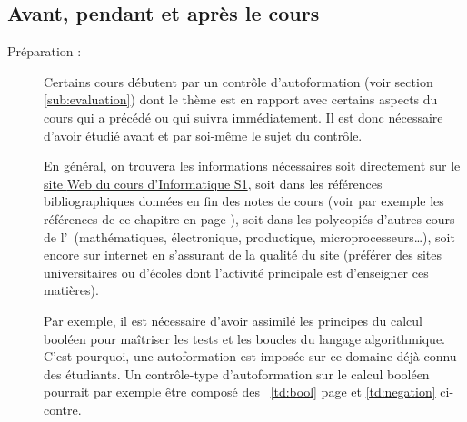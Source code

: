 \subsection{Avant, pendant et après le cours}\label{sub:cours}
\begin{description}
\item[Préparation :]  
	Certains cours débutent par un contrôle d'autoformation
	(voir section \ref{sub:evaluation}) dont le thème est en rapport avec certains
	aspects du cours qui a précédé ou qui suivra immédiatement.
	Il est donc nécessaire d'avoir étudié avant et par soi-même le
	sujet du contrôle.
	
	En général, on trouvera les informations nécessaires
	soit directement sur le 
	\href{https://moodle.enib.fr/course/view.php?id=24}{site {\sc Web} du cours d'Informatique S1}, 
	soit dans les références bibliographiques données en fin des notes de cours
	(voir par exemple les références de ce chapitre en page \pageref{ch:biblio}),
	soit dans les polycopiés d'autres cours de l'\enib\ (mathématiques, 
	électronique, productique, microprocesseurs\ldots), soit encore sur internet
	en s'assurant de la qualité du site (préférer des sites universitaires ou 
	d'écoles dont l'activité principale est d'enseigner ces matières).
	
	Par exemple, il est nécessaire d'avoir assimilé les principes
	du calcul booléen pour maîtriser les tests et les boucles du
	langage algorithmique. C'est pourquoi, une autoformation est
	imposée sur ce domaine déjà connu des étudiants.
	Un contrôle-type d'autoformation sur le calcul booléen 
	pourrait par exemple être composé des \tdir\ \ref{td:bool} 
	page \pageref{td:bool} et \ref{td:negation} ci-contre.\\
	

\end{description}
